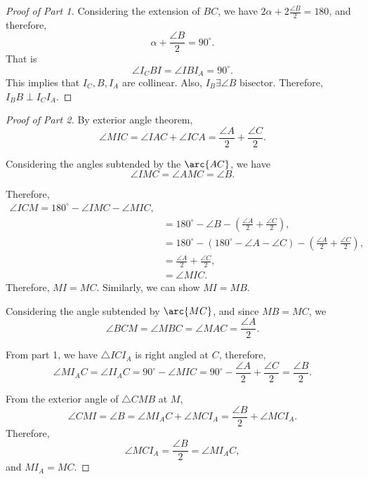 \documentclass[11pt,twoside]{scrartcl}
\begin{document}
\begin{proof}[Proof of Part 1]
    Considering the extension of $BC$, we have $2 \alpha + 2 \frac{\angle B}{2} = 180$, and therefore, 
    \[ \alpha + \frac{\angle B}{2} = 90^\circ.\]
    That is $$\angle I_CBI = \angle{IBI_A} = 90^\circ.$$
    This implies that $I_C, B, I_A$ are collinear. Also, $I_B \exists  \angle{B} \text{ bisector}$. Therefore, $I_BB\perp I_CI_A$.
\end{proof}

\begin{proof}[Proof of Part 2]
    By exterior angle theorem, 
    \[\angle{MIC} = \angle{IAC} + \angle{ICA} = \frac{\angle A}{2} + \frac{\angle C}{2}.\]
    
    Considering the angles subtended by the $\arc{AC}$, we have 
    \[\angle IMC = \angle AMC = \angle B.\]

    Therefore, 
    \begin{align*}
        \angle ICM = 180^\circ - \angle IMC - \angle{MIC}, \\
        &= 180^\circ - \angle B - (\frac{\angle A}{2} + \frac{\angle C}{2}), \\
        &= 180^\circ - (180^\circ - \angle A - \angle C) - (\frac{\angle A}{2} + \frac{\angle C}{2}), \\
        &= \frac{\angle A}{2} + \frac{\angle C}{2}, \\
        &= \angle MIC.
    \end{align*}
    Therefore, $MI = MC$. Similarly, we can show $MI = MB$.

    Considering the angle subtended by $\arc{MC}$, and since $MB = MC$, we 
    \[\angle BCM = \angle MBC = \angle MAC = \frac{\angle A}{2}.\]

   From part 1, we have $\triangle ICI_A$ is right angled at $C$, therefore, 
   \[\angle MI_AC = \angle II_AC = 90^\circ - \angle MIC = 90^\circ - \frac{\angle A}{2} + \frac{\angle C}{2} = \frac{\angle B}{2}.\]

   
    From the exterior angle of $\triangle CMB$ at $M$,
    \[ \angle CMI = \angle B = \angle MI_AC + \angle MCI_A = \frac{\angle B}{2} + \angle MCI_A.\]
    Therefore,
    \[ \angle MCI_A = \frac{\angle B}{2} = \angle MI_AC,\]
    and $MI_A = MC$.

\end{proof}
\end{document}
